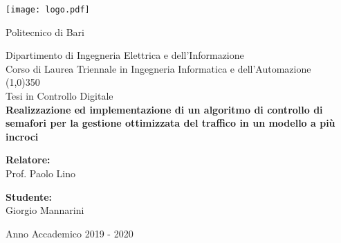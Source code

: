 \begin{titlepage}
		\begin{center}
			
			{\texttt{[image: logo.pdf]}}
			\vspace{0.5cm}
			
			{\LARGE{Politecnico di Bari}}\\
			\vspace{0.5cm}
			
			{\large{Dipartimento di Ingegneria Elettrica e dell'Informazione}}\\
			{\normalsize{Corso di Laurea Triennale in Ingegneria Informatica e dell'Automazione}}\\
			\line(1,0){350}\\
			\vfill
			{\large Tesi in Controllo Digitale}\\
			\vspace{0.5cm}		
			{\large \textbf {
Realizzazione ed implementazione di un algoritmo di controllo di semafori per la gestione ottimizzata del traffico in un modello a più incroci}}\\
		\end{center}
		\vfill
		\begin{minipage}{\textwidth}
			\begin{minipage}{2in}
				\textbf{Relatore:} \\
				Prof. Paolo Lino
			\end{minipage}
			\hfill
			\begin{minipage}{1.3in}
				\textbf{Studente:} \\
				Giorgio Mannarini
			\end{minipage}
		\end{minipage}
		\vfill
		\centering \small {Anno Accademico 2019 - 2020}

\end{titlepage}